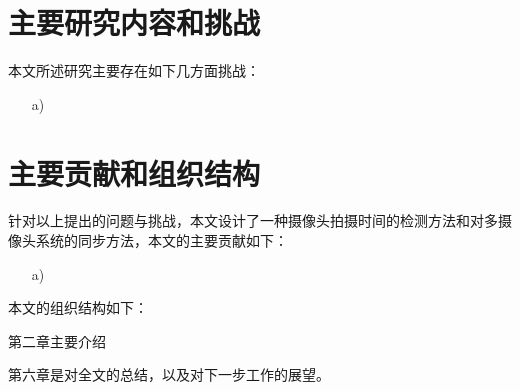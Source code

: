 \section{主要研究内容和挑战}


本文所述研究主要存在如下几方面挑战：

\begin{itemize}

\item[a)] 

\end{itemize}

\section{主要贡献和组织结构}

针对以上提出的问题与挑战，本文设计了一种摄像头拍摄时间的检测方法和对多摄像头系统的同步方法，本文的主要贡献如下：

\begin{itemize}

\item[a)]

\end{itemize}

本文的组织结构如下：

第二章主要介绍

第六章是对全文的总结，以及对下一步工作的展望。




































